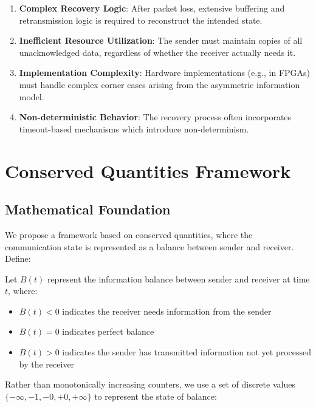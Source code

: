 \documentclass[../OAE-SPEC-MAIN.tex]{subfiles}
\begin{document}
\begin{enumerate}
    \item \textbf{Complex Recovery Logic}: After packet loss, extensive buffering and retransmission logic is required to reconstruct the intended state.
    
    \item \textbf{Inefficient Resource Utilization}: The sender must maintain copies of all unacknowledged data, regardless of whether the receiver actually needs it.
    
    \item \textbf{Implementation Complexity}: Hardware implementations (e.g., in FPGAs) must handle complex corner cases arising from the asymmetric information model.
    
    \item \textbf{Non-deterministic Behavior}: The recovery process often incorporates timeout-based mechanisms which introduce non-determinism.
\end{enumerate}

\section{Conserved Quantities Framework}

\subsection{Mathematical Foundation}

We propose a framework based on conserved quantities, where the communication state is represented as a balance between sender and receiver. Define:

\begin{highlightbox}
Let $B(t)$ represent the information balance between sender and receiver at time $t$, where:
\begin{itemize}
    \item $B(t) < 0$ indicates the receiver needs information from the sender
    \item $B(t) = 0$ indicates perfect balance
    \item $B(t) > 0$ indicates the sender has transmitted information not yet processed by the receiver
\end{itemize}
\end{highlightbox}

Rather than monotonically increasing counters, we use a set of discrete values $\{-\infty, -1, -0, +0, +\infty\}$ to represent the state of balance:
\end{document}
